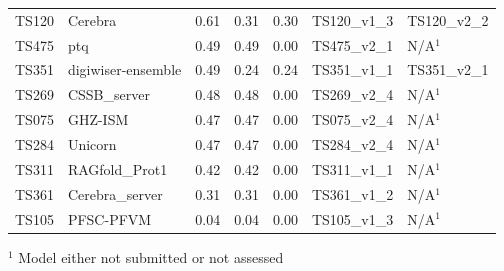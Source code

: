 \begin{table}[ht]
{\begin{tabular}{llrrrll}
TS120 & Cerebra & 0.61 & 0.31 & 0.30 & TS120\_v1\_3 & TS120\_v2\_2 \\ 
TS475 & ptq & 0.49 & 0.49 & 0.00 & TS475\_v2\_1 & N/A$^{1}$ \\ 
TS351 & digiwiser-ensemble & 0.49 & 0.24 & 0.24 & TS351\_v1\_1 & TS351\_v2\_1 \\ 
TS269 & CSSB\_server & 0.48 & 0.48 & 0.00 & TS269\_v2\_4 & N/A$^{1}$ \\ 
TS075 & GHZ-ISM & 0.47 & 0.47 & 0.00 & TS075\_v2\_4 & N/A$^{1}$ \\ 
TS284 & Unicorn & 0.47 & 0.47 & 0.00 & TS284\_v2\_4 & N/A$^{1}$ \\ 
TS311 & RAGfold\_Prot1 & 0.42 & 0.42 & 0.00 & TS311\_v1\_1 & N/A$^{1}$ \\ 
TS361 & Cerebra\_server & 0.31 & 0.31 & 0.00 & TS361\_v1\_2 & N/A$^{1}$ \\ 
TS105 & PFSC-PFVM & 0.04 & 0.04 & 0.00 & TS105\_v1\_3 & N/A$^{1}$ \\ 
\bottomrule
\end{tabular}%
}
\begin{flushleft}\footnotesize $^{1}$ Model either not submitted or not assessed\end{flushleft}
\end{table}
